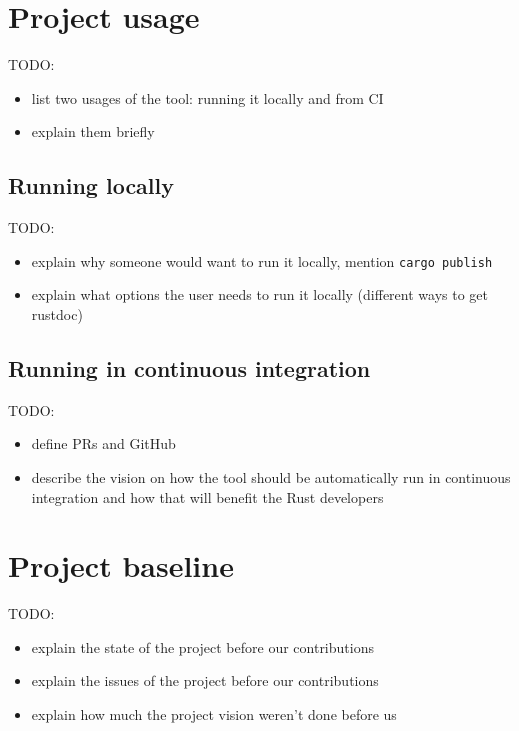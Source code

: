 \documentclass[licencjacka,en]{pracamgr}
\begin{document}
\section{Project usage}

TODO:
\begin{itemize}
	\item list two usages of the tool: running it locally and from CI
	\item explain them briefly
\end{itemize}

\subsection{Running locally}

TODO:
\begin{itemize}
	\item explain why someone would want to run it locally, mention \texttt{cargo publish}
	\item explain what options the user needs to run it locally (different ways to get rustdoc)
\end{itemize}

\subsection{Running in continuous integration}

TODO:
\begin{itemize}
	\item define PRs and GitHub
	\item describe the vision on how the tool should be automatically run in continuous integration
		and how that will benefit the Rust developers
\end{itemize}

\section{Project baseline}

TODO:
\begin{itemize}
	\item explain the state of the project before our contributions
	\item explain the issues of the project before our contributions
	\item explain how much the project vision weren't done before us
\end{itemize}

\end{document}
